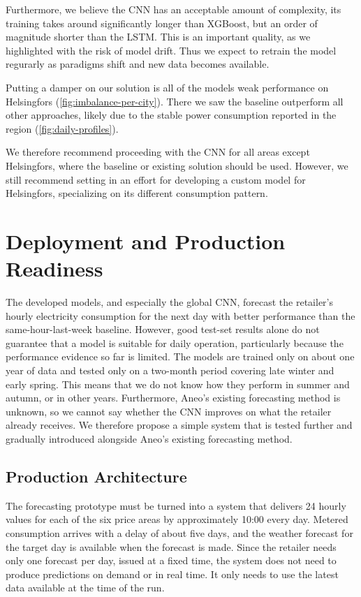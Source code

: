 \documentclass[11pt,a4paper]{article}
\begin{document}
Furthermore, we believe the CNN has an acceptable amount of complexity, its training takes around significantly longer than XGBoost, but an order of magnitude shorter than the LSTM. This is an important quality, as we highlighted with the risk of model drift. Thus we expect  to retrain the model regurarly as paradigms shift and new data becomes available.

Putting a damper on our solution is all of the models weak performance on Helsingfors (\cref{fig:imbalance-per-city}). There we saw the baseline outperform all other approaches, likely due to the stable power consumption reported in the region (\cref{fig:daily-profiles}).

We therefore recommend proceeding with the CNN for all areas except Helsingfors, where the baseline or existing solution should be used. However, we still recommend setting in an effort for developing a custom model for Helsingfors, specializing on its different consumption pattern. 
\newpage









\section{Deployment and Production Readiness}
\label{sec:deployment}
The developed models, and especially the global CNN, forecast the retailer’s hourly electricity consumption for the next day with better performance than the same-hour-last-week baseline. However, good test-set results alone do not guarantee that a model is suitable for daily operation, particularly because the performance evidence so far is limited. The models are trained only on about one year of data and tested only on a two-month period covering late winter and early spring. This means that we do not know how they perform in summer and autumn, or in other years. Furthermore, Aneo’s existing forecasting method is unknown, so we cannot say whether the CNN improves on what the retailer already receives. We therefore propose a simple system that is tested further and gradually introduced alongside Aneo’s existing forecasting method.

\subsection{Production Architecture}
The forecasting prototype must be turned into a system that delivers 24 hourly values for each of the six price areas by approximately 10:00 every day. Metered consumption arrives with a delay of about five days, and the weather forecast for the target day is available when the forecast is made. Since the retailer needs only one forecast per day, issued at a fixed time, the system does not need to produce predictions on demand or in real time. It only needs to use the latest data available at the time of the run.
\end{document}
